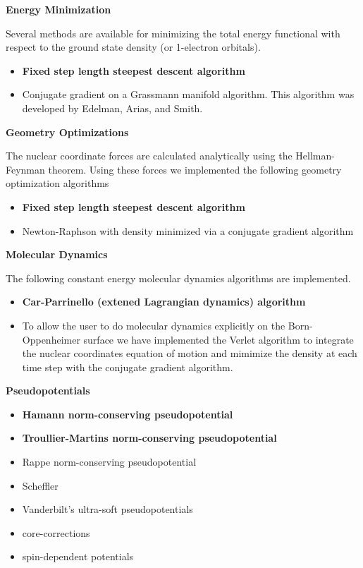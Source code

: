 \large
\textbf{Energy Minimization}
\normalsize

Several methods are  available for minimizing the total energy functional
with respect to the ground state density (or 1-electron orbitals).
\begin{itemize}
	\item \textbf{Fixed step length steepest descent algorithm}
	\item Conjugate gradient on a Grassmann manifold algorithm.
	      This algorithm was developed by Edelman, Arias, and Smith.
\end{itemize}

\large
\textbf{Geometry Optimizations}
\normalsize

The nuclear coordinate forces are calculated analytically using the 
Hellman-Feynman theorem.  Using these forces we implemented the following
geometry optimization algorithms
\begin{itemize}
	\item \textbf{Fixed step length steepest descent algorithm}
	\item Newton-Raphson with density minimized via a conjugate
	      gradient algorithm
\end{itemize}

\large
\textbf{Molecular Dynamics}
\normalsize

The following constant energy molecular dynamics algorithms are implemented.
\begin{itemize}
	\item \textbf{Car-Parrinello (extened Lagrangian dynamics) algorithm}
	\item To allow the user to do molecular dynamics explicitly on
	      the Born-Oppenheimer surface we have implemented the Verlet
	      algorithm to integrate the nuclear coordinates equation of
	      motion and mimimize the density at each time step with
	      the conjugate gradient algorithm.
\end{itemize}

\large
\textbf{Pseudopotentials}
\normalsize

\begin{itemize}
	\item \textbf{Hamann norm-conserving pseudopotential}
	\item \textbf{Troullier-Martins norm-conserving pseudopotential}
	\item Rappe norm-conserving pseudopotential
	\item Scheffler
	\item Vanderbilt's ultra-soft pseudopotentials
	\item core-corrections	
	\item spin-dependent potentials
\end{itemize}


